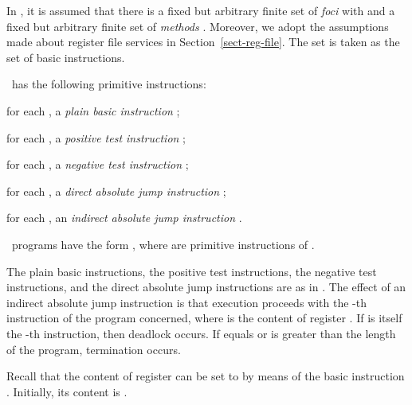 \documentclass[fleqn]{llncs}
\begin{document}
In \PGLDij, it is assumed that there is a fixed but arbitrary finite set
of \emph{foci}  with  and a fixed but arbitrary
finite set of \emph{methods} .
Moreover, we adopt the assumptions made about register file services in
Section~\ref{sect-reg-file}.
The set  is taken as the set
 of basic instructions.

\PGLDij\ has the following primitive instructions:
\begin{iteml}
\item
for each , a \emph{plain basic instruction} ;
\item
for each , a \emph{positive test instruction} ;
\item
for each , a \emph{negative test instruction} ;
\item
for each , a \emph{direct absolute jump instruction}
;
\item
for each , an \emph{indirect absolute jump instruction}
.
\end{iteml}
\PGLDij\ programs have the form , where
 are primitive instructions of \PGLDij.
\pagebreak[2]

The plain basic instructions, the positive test instructions, the
negative test instructions, and the direct absolute jump instructions
are as in \PGLD.
The effect of an indirect absolute jump instruction  is that
execution proceeds with the -th instruction of the program concerned,
where  is the content of register .
If  is itself the -th instruction, then deadlock occurs.
If  equals  or  is greater than the length of the program,
termination occurs.

Recall that the content of register  can be set to  by means of
the basic instruction .
Initially, its content is .
\end{document}
